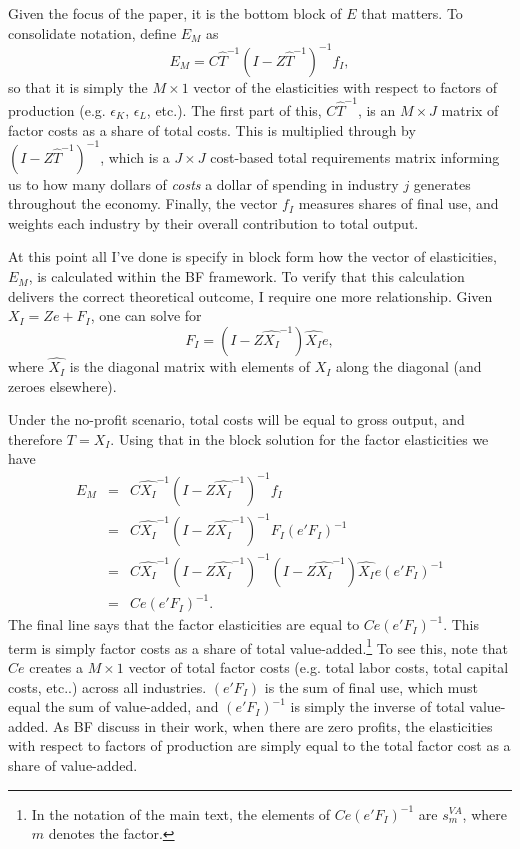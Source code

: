 Given the focus of the paper, it is the bottom block of $E$ that matters. To consolidate notation, define $E_M$ as
\begin{equation}
	E_M = C\hat{T}^{-1} \left(I-Z\hat{T}^{-1}\right)^{-1}f_I, \label{EQ_EM_Z}
\end{equation}
so that it is simply the $M \times 1$ vector of the elasticities with respect to factors of production (e.g. $\epsilon_K$, $\epsilon_L$, etc.). The first part of this, $C\hat{T}^{-1}$, is an $M \times J$ matrix of factor costs as a share of total costs. This is multiplied through by $\left(I-Z\hat{T}^{-1}\right)^{-1}$, which is a $J \times J$ cost-based total requirements matrix informing us to how many dollars of \textit{costs} a dollar of spending in industry $j$ generates throughout the economy. Finally, the vector $f_I$ measures shares of final use, and weights each industry by their overall contribution to total output. 

At this point all I've done is specify in block form how the vector of elasticities, $E_M$, is calculated within the BF framework. To verify that this calculation delivers the correct theoretical outcome, I require one more relationship. Given $X_I = Ze + F_I$, one can solve for
\begin{equation*}
	F_I = (I - Z\hat{X_I}^{-1})\hat{X_I}e,
\end{equation*}
where $\hat{X_I}$ is the diagonal matrix with elements of $X_I$ along the diagonal (and zeroes elsewhere). 

Under the no-profit scenario, total costs will be equal to gross output, and therefore $T = X_I$. Using that in the block solution for the factor elasticities we have
\begin{eqnarray*}
	E_M &=& C\hat{X_I}^{-1} \left(I-Z\hat{X_I}^{-1}\right)^{-1}f_I \\
				&=& C\hat{X_I}^{-1} \left(I-Z\hat{X_I}^{-1}\right)^{-1} F_I (e'F_I)^{-1} \\
				&=& C\hat{X_I}^{-1} \left(I-Z\hat{X_I}^{-1}\right)^{-1}(I - Z\hat{X_I}^{-1})\hat{X_I}e (e'F_I)^{-1} \\
				&=& Ce(e'F_I)^{-1}.
\end{eqnarray*}
The final line says that the factor elasticities are equal to $Ce(e'F_I)^{-1}$. This term is simply factor costs as a share of total value-added.\footnote{In the notation of the main text, the elements of $Ce(e'F_I)^{-1}$ are $s^{VA}_{m}$, where $m$ denotes the factor.} To see this, note that $Ce$ creates a $M \times 1$ vector of total factor costs (e.g. total labor costs, total capital costs, etc..) across all industries. $(e'F_I)$ is the sum of final use, which must equal the sum of value-added, and $(e'F_I)^{-1}$ is simply the inverse of total value-added. As BF discuss in their work, when there are zero profits, the elasticities with respect to factors of production are simply equal to the total factor cost as a share of value-added. 

